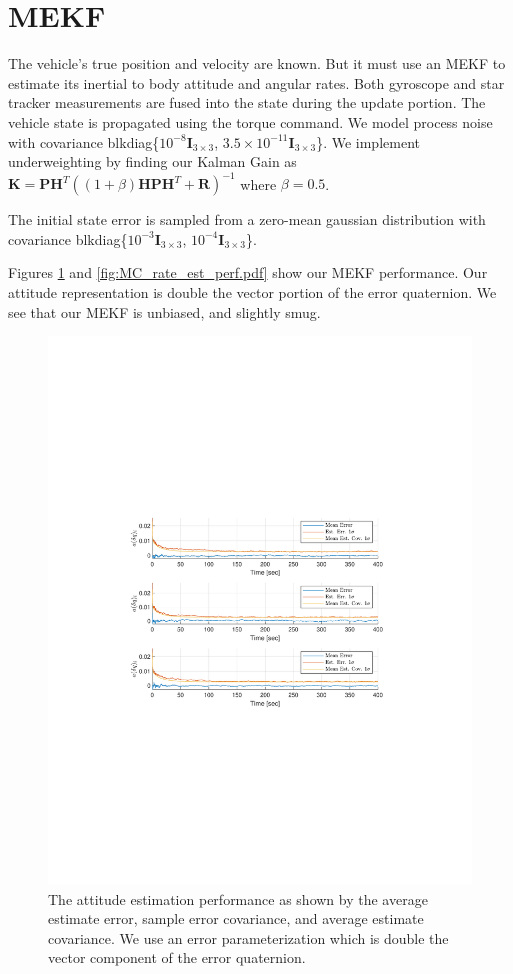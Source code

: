 \documentclass[]{article}
\begin{document}
\section{MEKF}

The vehicle's true position and velocity are known. But it must use an MEKF to estimate its inertial to body attitude and angular rates. Both gyroscope and star tracker measurements are fused into the state during the update portion. The vehicle state is propagated using the torque command. We model process noise with covariance blkdiag\{$10^{-8}\bm{I}_{3 \times 3}$, $3.5\times10^{-11}\bm{I}_{3 \times 3}$\}. We implement underweighting by finding our Kalman Gain as $\bm{K} = \bm{PH}^T \left((1 + \beta)\bm{HPH}^T + \bm{R}\right)^{-1}$ where $\beta = 0.5$.

The initial state error is sampled from a zero-mean gaussian distribution with covariance blkdiag\{$10^{-3}\bm{I}_{3 \times 3}$, $10^{-4}\bm{I}_{3 \times 3}$\}.

Figures \ref{fig:MC_quat_est_perf.pdf} and \ref{fig:MC_rate_est_perf.pdf} show our MEKF performance. Our attitude representation is double the vector portion of the error quaternion. We see that our MEKF is unbiased, and slightly smug.

\begin{figure}[!h]
	\centering
	\includegraphics[width=\linewidth,trim={4cm, 8cm, 4cm, 8cm},clip]{figs/MC_quat_est_perf.pdf}
	\caption{The attitude estimation performance as shown by the average estimate error, sample error covariance, and average estimate covariance. We use an error parameterization which is double the vector component of the error quaternion.}
	\label{fig:MC_quat_est_perf.pdf}
\end{figure}
\end{document}

